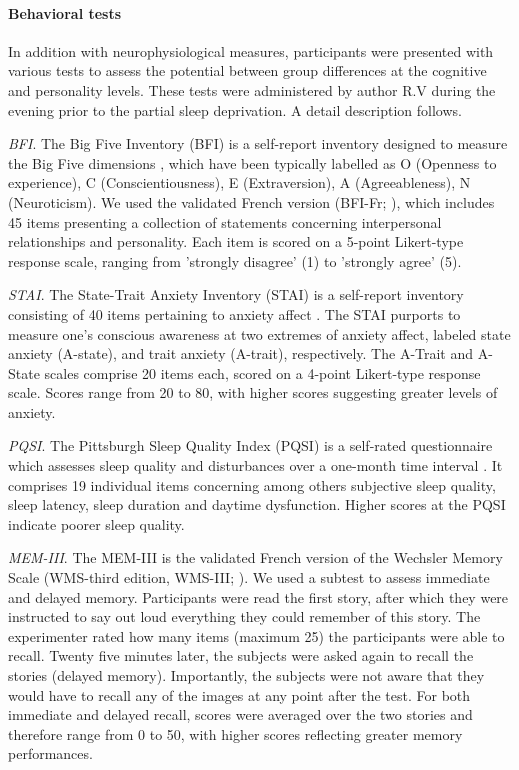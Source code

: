 \paragraph{Behavioral tests}
In addition with neurophysiological measures, participants were presented with various tests to assess the potential between group differences at the cognitive and personality levels. These tests were administered by author R.V during the evening prior to the partial sleep deprivation. A detail description follows.

\emph{BFI}. The Big Five Inventory (BFI) is a self-report inventory designed to measure the Big Five dimensions \citep{john_big_1999}, which have been typically labelled as O (Openness to experience), C (Conscientiousness), E (Extraversion), A (Agreeableness), N (Neuroticism). We used the validated French version (BFI-Fr; \citealp{plaisant_validation_2010}), which includes 45 items presenting a collection of statements concerning interpersonal relationships and personality. Each item is scored on a 5-point Likert-type response scale, ranging from 'strongly disagree' (1) to 'strongly agree' (5).

\emph{STAI}. The State-Trait Anxiety Inventory (STAI) is a self-report inventory consisting of 40 items pertaining to anxiety affect \citep{spielberger_manual_1970}. The STAI purports to measure one's conscious awareness at two extremes of anxiety affect, labeled state anxiety (A-state), and trait anxiety (A-trait), respectively. The A-Trait and A-State scales comprise 20 items each, scored on a 4-point Likert-type response scale. Scores range from 20 to 80, with higher scores suggesting greater levels of anxiety.

\emph{PQSI}. The Pittsburgh Sleep Quality Index (PQSI) is a self-rated questionnaire which assesses sleep quality and disturbances over a one-month time interval \citep{buysse_pittsburgh_1989}. It comprises 19 individual items concerning among others subjective sleep quality, sleep latency, sleep duration and daytime dysfunction. Higher scores at the PQSI indicate poorer sleep quality.

\emph{MEM-III}. The MEM-III is the validated French version of the Wechsler Memory Scale (WMS-third edition, WMS-III; \citealp{wechsler_mem-iii:_2001}).  We used a subtest to assess immediate and delayed memory. Participants were read the first story, after which they were instructed to say out loud everything they could remember of this story. The experimenter rated how many items (maximum 25) the participants were able to recall. Twenty five minutes later, the subjects were asked again to recall the stories (delayed memory). Importantly, the subjects were not aware that they would have to recall any of the images at any point after the test. For both immediate and delayed recall, scores were averaged over the two stories and therefore range from 0 to 50, with higher scores reflecting greater memory performances.

